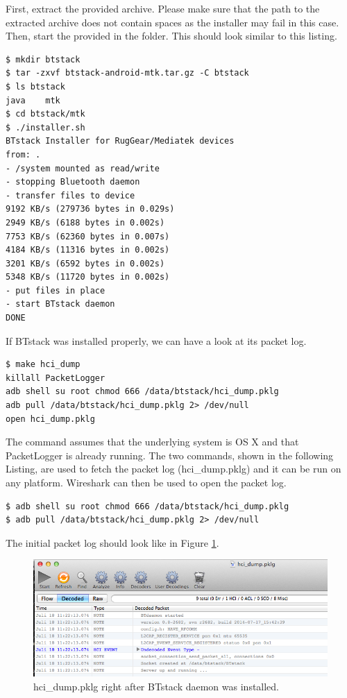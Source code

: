 \documentclass[a4paper,titlepage,oneside,12pt]{amsart} %
\begin{document}
First, extract the provided  archive. Please make sure that the path to the extracted archive does not contain spaces as the installer may fail in this case. Then, start the provided  in the  folder. This should look similar to this listing.

\begin{lstlisting}
$ mkdir btstack
$ tar -zxvf btstack-android-mtk.tar.gz -C btstack
$ ls btstack
java	mtk
$ cd btstack/mtk
$ ./installer.sh
BTstack Installer for RugGear/Mediatek devices
from: .
- /system mounted as read/write
- stopping Bluetooth daemon
- transfer files to device
9192 KB/s (279736 bytes in 0.029s)
2949 KB/s (6188 bytes in 0.002s)
7753 KB/s (62360 bytes in 0.007s)
4184 KB/s (11316 bytes in 0.002s)
3201 KB/s (6592 bytes in 0.002s)
5348 KB/s (11720 bytes in 0.002s)
- put files in place
- start BTstack daemon
DONE
\end{lstlisting}

If BTstack was installed properly, we can have a look at its packet log.

\begin{lstlisting}
$ make hci_dump
killall PacketLogger
adb shell su root chmod 666 /data/btstack/hci_dump.pklg
adb pull /data/btstack/hci_dump.pklg 2> /dev/null
open hci_dump.pklg
\end{lstlisting}

The   command assumes that the underlying system is OS X and that PacketLogger is already running. The two commands, shown in the following Listing, are used to fetch the packet log (hci\_dump.pklg) and it can be run on any platform. Wireshark can then be used to open the packet log.

\begin{lstlisting}
$ adb shell su root chmod 666 /data/btstack/hci_dump.pklg
$ adb pull /data/btstack/hci_dump.pklg 2> /dev/null
\end{lstlisting}

The initial packet log should look like in Figure \ref{fig:firstLog}.

\begin{figure}[htbp]
\begin{center}
 \includegraphics[width=\textwidth]{picts/ruggear_initial_hci_dump.pdf} 
\caption{hci\_dump.pklg right after BTstack daemon was installed.}
\label{fig:firstLog}
\end{center}
\end{figure}
\end{document}
